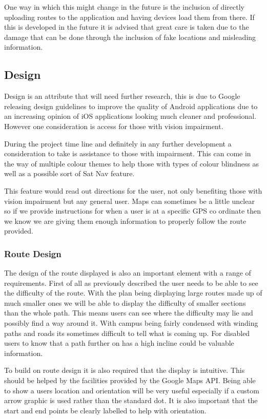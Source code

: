 One way in which this might change in the future is the inclusion of directly uploading routes to the application and having devices load them from there. If this is developed in the future it is advised that great care is taken due to the damage that can be done through the inclusion of fake locations and misleading information. 

\subsection{Design}
Design is an attribute that will need further research, this is due to Google releasing design guidelines\cite{material} to improve the quality of Android applications due to an increasing opinion of iOS applications looking much cleaner and professional. However one consideration is access for those with vision impairment.

During the project time line and definitely in any further development a consideration to take is assistance to those with impairment. This can come in the way of multiple colour themes to help those with types of colour blindness as well as a possible sort of Sat Nav feature.

This feature would read out directions for the user, not only benefiting those with vision impairment but any general user. Maps can sometimes be a little unclear so if we provide instructions for when a user is at a specific GPS co ordinate then we know we are giving them enough information to properly follow the route provided. 
\subsubsection{Route Design}
The design of the route displayed is also an important element with a range of requirements. First of all as previously described the user needs to be able to see the difficulty of the route. With the plan being displaying large routes made up of much smaller ones we will be able to display the difficulty of smaller sections than the whole path. This means users can see where the difficulty may lie and possibly find a way around it. With campus being fairly condensed with winding paths and roads its sometimes difficult to tell what is coming up. For disabled users to know that a path further on has a high incline could be valuable information. 

To build on route design it is also required that the display is intuitive. This should be helped by the facilities provided by the Google Maps API\cite{maps}. Being able to show a users location and orientation will be very useful especially if a custom arrow graphic is used rather than the standard dot. It is also important that the start and end points be clearly labelled to help with orientation. 
\newpage
